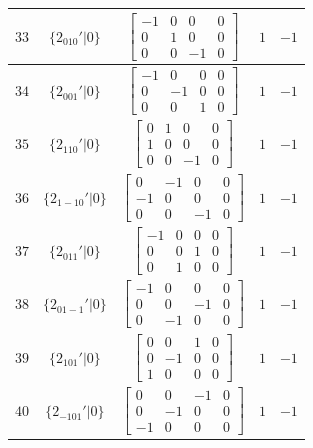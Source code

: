\documentclass[fleqn,8pt]{jsarticle}
\begin{document}
\begin{longtable}{ccccc}
$ 33 $ & $ \{2{}_{010}{}'|0\} $ & $ \begin{bmatrix} -1 & 0 & 0 & 0 \\ 0 & 1 & 0 & 0 \\ 0 & 0 & -1 & 0 \end{bmatrix} $ & $ 1 $ & $ -1 $ \\ \hline
$ 34 $ & $ \{2{}_{001}{}'|0\} $ & $ \begin{bmatrix} -1 & 0 & 0 & 0 \\ 0 & -1 & 0 & 0 \\ 0 & 0 & 1 & 0 \end{bmatrix} $ & $ 1 $ & $ -1 $ \\ \hline
$ 35 $ & $ \{2{}_{110}{}'|0\} $ & $ \begin{bmatrix} 0 & 1 & 0 & 0 \\ 1 & 0 & 0 & 0 \\ 0 & 0 & -1 & 0 \end{bmatrix} $ & $ 1 $ & $ -1 $ \\ \hline
$ 36 $ & $ \{2{}_{1-10}{}'|0\} $ & $ \begin{bmatrix} 0 & -1 & 0 & 0 \\ -1 & 0 & 0 & 0 \\ 0 & 0 & -1 & 0 \end{bmatrix} $ & $ 1 $ & $ -1 $ \\ \hline
$ 37 $ & $ \{2{}_{011}{}'|0\} $ & $ \begin{bmatrix} -1 & 0 & 0 & 0 \\ 0 & 0 & 1 & 0 \\ 0 & 1 & 0 & 0 \end{bmatrix} $ & $ 1 $ & $ -1 $ \\ \hline
$ 38 $ & $ \{2{}_{01-1}{}'|0\} $ & $ \begin{bmatrix} -1 & 0 & 0 & 0 \\ 0 & 0 & -1 & 0 \\ 0 & -1 & 0 & 0 \end{bmatrix} $ & $ 1 $ & $ -1 $ \\ \hline
$ 39 $ & $ \{2{}_{101}{}'|0\} $ & $ \begin{bmatrix} 0 & 0 & 1 & 0 \\ 0 & -1 & 0 & 0 \\ 1 & 0 & 0 & 0 \end{bmatrix} $ & $ 1 $ & $ -1 $ \\ \hline
$ 40 $ & $ \{2{}_{-101}{}'|0\} $ & $ \begin{bmatrix} 0 & 0 & -1 & 0 \\ 0 & -1 & 0 & 0 \\ -1 & 0 & 0 & 0 \end{bmatrix} $ & $ 1 $ & $ -1 $ \\ \hline

\end{longtable}
\end{document}
